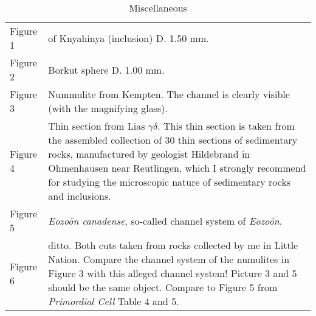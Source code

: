 \documentclass[a4paper, 12pt, oneside]{article}
\begin{document}
\begin{table}[ht!]
\caption{Miscellaneous}
\centering
\begin{tabular}{ p{2cm} p{10cm} }
\hline
 Figure 1 & of Knyahinya (inclusion) D. 1.50 mm. \\
 Figure 2 & Borkut sphere D. 1.00 mm. \\
 Figure 3 & Nummulite from Kempten. The channel is clearly visible (with the magnifying glass). \\
 Figure 4 & Thin section from Lias $\gamma\delta$. This thin section is taken from the assembled collection of 30 thin sections of sedimentary rocks, manufactured by geologist Hildebrand in Ohmenhausen near Reutlingen, which I strongly recommend for studying the microscopic nature of sedimentary rocks and inclusions. \\
 Figure 5 & \emph{Eozoön canadense}, so-called channel system of \emph{Eozoön}. \\
 Figure 6 & ditto. Both cuts taken from rocks collected by me in Little Nation. Compare the channel system of the numulites in Figure 3 with this alleged channel system! Picture 3 and 5 should be the same object. Compare to Figure 5 from \emph{Primordial Cell} Table 4 and 5. \\
\end{tabular}
\label{table:32}
\end{table}
\clearpage
\end{document}

